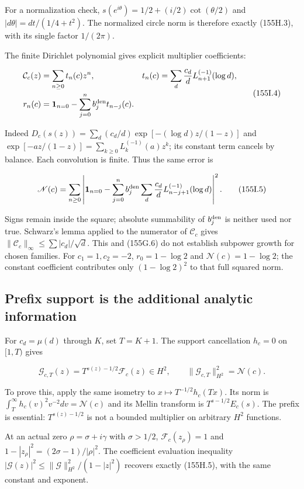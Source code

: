 \documentclass[
  11pt,
]{book}
\begin{document}
For a normalization check, \(s(e^{i\theta})=1/2+(i/2)\cot(\theta/2)\)
and \(|d\theta|=dt/(1/4+t^2)\). The normalized circle norm is therefore
exactly (155H.3), with its single factor \(1/(2\pi)\).

The finite Dirichlet polynomial gives explicit multiplier coefficients:

\[
\begin{aligned}
\mathcal C_c(z)&=\sum_{n\ge0}t_n(c)z^n,
 &t_n(c)&=\sum_d\frac{c_d}{d}L_{n+1}^{(-1)}(\log d),\\
r_n(c)&=\mathbf1_{n=0}-\sum_{j=0}^n b_j^{\rm den}t_{n-j}(c).
\end{aligned}
\tag{155I.4}
\]

Indeed \(D_c(s(z))=\sum_d(c_d/d)\exp[-(\log d)z/(1-z)]\) and
\(\exp[-az/(1-z)]=\sum_{k\ge0}L_k^{(-1)}(a)z^k\); its constant term
cancels by balance. Each convolution is finite. Thus the same error is

\[
\mathscr N(c)=\sum_{n\ge0}\left|
\mathbf1_{n=0}-\sum_{j=0}^n b_j^{\rm den}
  \sum_d\frac{c_d}{d}L_{n-j+1}^{(-1)}(\log d)\right|^2.
\tag{155I.5}
\]

Signs remain inside the square; absolute summability of
\(b_j^{\rm den}\) is neither used nor true. Schwarz's lemma applied to
the numerator of \(\mathcal C_c\) gives
\(\|\mathcal C_c\|_\infty\le\sum|c_d|/\sqrt d\). This and (155G.6) do
not establish subpower growth for chosen families. For \(c_1=1,c_2=-2\),
\(r_0=1-\log2\) and \(\mathscr N(c)=1-\log2\); the constant coefficient
contributes only \((1-\log2)^2\) to that full squared norm.

\subsection{Prefix support is the additional analytic
information}\label{prefix-support-is-the-additional-analytic-information}

For \(c_d=\mu(d)\) through \(K\), set \(T=K+1\). The support
cancellation \(h_c=0\) on \([1,T)\) gives

\[
\mathcal G_{c,T}(z)=T^{s(z)-1/2}\mathcal F_c(z)\in H^2,
\qquad \|\mathcal G_{c,T}\|_{H^2}^2=\mathscr N(c).
\tag{155I.6}
\]

To prove this, apply the same isometry to \(x\mapsto T^{-1/2}h_c(Tx)\).
Its norm is \(\int_T^\infty h_c(v)^2v^{-2}dv=\mathscr N(c)\) and its
Mellin transform is \(T^{s-1/2}E_c(s)\). The prefix is essential:
\(T^{s(z)-1/2}\) is not a bounded multiplier on arbitrary \(H^2\)
functions.

At an actual zero \(\rho=\sigma+i\gamma\) with \(\sigma>1/2\),
\(\mathcal F_c(z_\rho)=1\) and \(1-|z_\rho|^2=(2\sigma-1)/|\rho|^2\).
The coefficient evaluation inequality
\(|\mathcal G(z)|^2\le\|\mathcal G\|_{H^2}^2/(1-|z|^2)\) recovers
exactly (155H.5), with the same constant and exponent.
\end{document}
